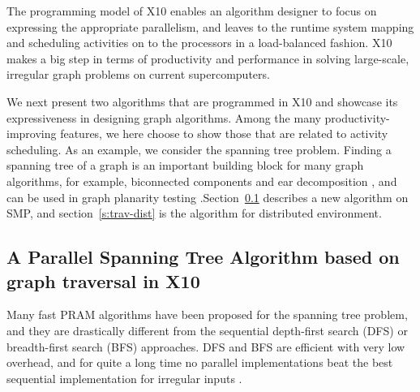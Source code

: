 The programming model of X10 enables an algorithm designer to focus on expressing the appropriate parallelism, and leaves to the runtime system mapping and scheduling activities on to the processors in a load-balanced fashion. X10 makes a big step in terms of productivity and performance in solving large-scale, irregular graph problems on current supercomputers.


 We next present two algorithms that are programmed in X10 and showcase its expressiveness in designing graph algorithms. Among the many productivity-improving features, we here choose to show those that are related to activity scheduling. 
As an example, we consider the spanning tree problem. Finding a spanning tree of a graph is an important building
block for many graph algorithms, for example, biconnected components
and ear decomposition \cite{MR86}, and can be used in graph planarity
testing \cite{KR88}.Section~\ref{s:trav} describes a new algorithm on SMP, and section~\ref{s:trav-dist} is the algorithm
for distributed environment.


 

\subsection{A Parallel Spanning Tree Algorithm based on graph traversal in X10}
\label{s:trav}

Many fast PRAM algorithms have been proposed for the spanning tree problem, and they 
are drastically different from the sequential depth-first search (DFS) or breadth-first search (BFS) approaches.
DFS and BFS are efficient with very low overhead, and for quite a long time no parallel implementations beat the
best sequential implementation for irregular inputs \cite{BC04a}. 

